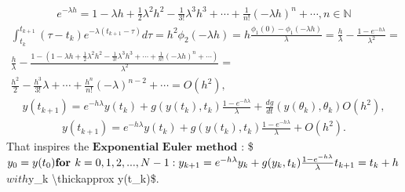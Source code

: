 \documentclass[letterpaper,10pt,english]{jupyterBook}
\begin{document}
\begin{equation*}
\begin{split}
    e^{-\lambda h} = 1 - \lambda h + \frac{1}{2}\lambda^2h^2 - \frac{1}{3!}\lambda^3h^3 + \dotsi + \frac{1}{n!} (-\lambda h)^n + \dotsi, n \in \mathbb{N}
\end{split}
\end{equation*}\begin{equation*}
\begin{split}
     \int_{t_k}^{t_{k+1}} (\tau - t_k) e^{-\lambda(t_{k+1}-\tau)} d\tau =
     h^2 \phi_2 (-\lambda h) =
     h \frac{\phi_1(0) - \phi_1(-\lambda h)}{\lambda} =
     \frac{h}{\lambda} - \frac{1-e^{-h \lambda}}{\lambda^2} = \\
     \frac{h}{\lambda} - \frac{1-(1 - \lambda h + \frac{1}{2}\lambda^2h^2 - \frac{1}{3!}\lambda^3h^3 + \dotsi + \frac{1}{n!} (-\lambda h)^n + \dotsi)}{\lambda^2} = \\
     \frac{h^2}{2} - \frac{h^3}{3!} \lambda + \dotsi + \frac{h^n}{n!} (-\lambda)^{n-2} + \dotsi  =  O(h^2),
\end{split}
\end{equation*}\begin{equation*}
\begin{split}
    y(t_{k+1}) = e^{-h \lambda}y(t_k) + g(y(t_k), t_k) \frac{1-e^{-h \lambda}}{\lambda} + \frac{dg}{dt} (y(\theta_k), \theta_k) O(h^2),
\end{split}
\end{equation*}\begin{equation*}
\begin{split}
  y(t_{k+1}) = e^{-h \lambda}y(t_k) + g(y(t_k), t_k) \frac{1-e^{-h \lambda}}{\lambda} + O(h^2).
\end{split}
\end{equation*}
\sphinxAtStartPar
That inspires the \(\textbf{Exponential Euler method}\) :
\$\(
y_0 = y(t_0)\\
\textbf{for } k = 0, 1, 2, ..., N-1 :\\
    y_{k+1} = e^{-h \lambda}y_k + g(y_k, t_k) \frac{1-e^{-h \lambda}}{\lambda}\\
    t_{k+1} = t_k + h
\)\(
with \)y\_k \textbackslash{}thickapprox y(t\_k)\$.
\end{document}
